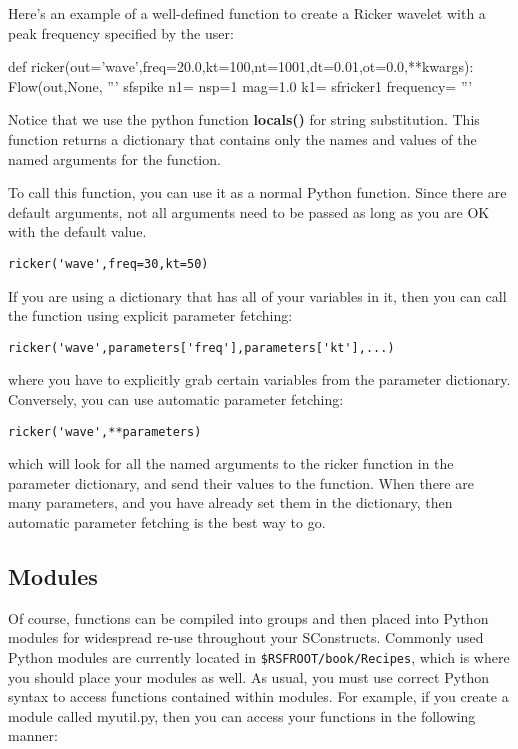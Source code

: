 Here's an example of a well-defined function to create a Ricker wavelet with a peak frequency specified by the user:

\begin{verbatimtab}[4]
def ricker(out='wave',freq=20.0,kt=100,nt=1001,dt=0.01,ot=0.0,**kwargs):
	Flow(out,None,
		'''
		sfspike n1=%
        nsp=1 mag=1.0 k1=%
		sfricker1 frequency=%
		''' %
\end{verbatimtab}

Notice that we use the python function \textbf{locals()} for string substitution.  This function returns a dictionary that contains only the names and values of the named arguments for the function.  

To call this function, you can use it as a normal Python function.  Since there are default arguments, not all arguments need to be passed as long as you are OK with the default value.  

\begin{verbatim}
ricker('wave',freq=30,kt=50)
\end{verbatim}

If you are using a dictionary that has all of your variables in it, then you can call the function using explicit parameter fetching:

\begin{verbatim}
ricker('wave',parameters['freq'],parameters['kt'],...)
\end{verbatim}

where you have to explicitly grab certain variables from the parameter dictionary.  Conversely, you can use automatic parameter fetching: 

\begin{verbatim}
ricker('wave',**parameters)
\end{verbatim}

which will look for all the named arguments to the ricker function in the parameter dictionary, and send their values to the function.  When there are many parameters, and you have already set them in the dictionary, then automatic parameter fetching is the best way to go.

\subsection{Modules}
Of course, functions can be compiled into groups and then placed into Python modules for widespread re-use throughout your SConstructs.  Commonly used Python modules are currently located in \texttt{\$RSFROOT/book/Recipes}, which is where you should place your modules as well.  As usual, you must use correct Python syntax to access functions contained within modules.  For example, if you create a module called myutil.py, then you can access your functions in the following manner:

